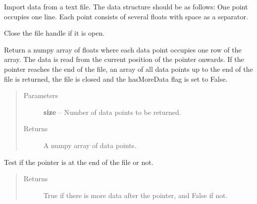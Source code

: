 \documentclass[letterpaper,10pt,english]{sphinxmanual}
\begin{document}
\begin{fulllineitems}
\label{common:common_data_importer.CommonFileDataImporter}
Import data from a text file. The data structure should be as follows:
One point occupies one line.
Each point consists of several floats with space as a separator.

\begin{fulllineitems}
\label{common:common_data_importer.CommonFileDataImporter.close_file}
Close the file handle if it is open.

\end{fulllineitems}


\begin{fulllineitems}
\label{common:common_data_importer.CommonFileDataImporter.get_data}
Return a numpy array of floats where each data point occupies one row of the array. The data is read from
the current position of the pointer onwards. If the pointer reaches the end of the file, an array of all data
points up to the end of the file is returned, the file is closed and the hasMoreData flag is set to False.
\begin{quote}\begin{description}
\item[{Parameters}] \leavevmode
\textbf{size} -- Number of data points to be returned.

\item[{Returns}] \leavevmode
A numpy array of data points.

\end{description}\end{quote}

\end{fulllineitems}


\begin{fulllineitems}
\label{common:common_data_importer.CommonFileDataImporter.has_more_data}
Test if the pointer is at the end of the file or not.
\begin{quote}\begin{description}
\item[{Returns}] \leavevmode
True if there is more data after the pointer, and False if not.


\end{description}
\end{quote}
\end{fulllineitems}
\end{fulllineitems}
\end{document}

